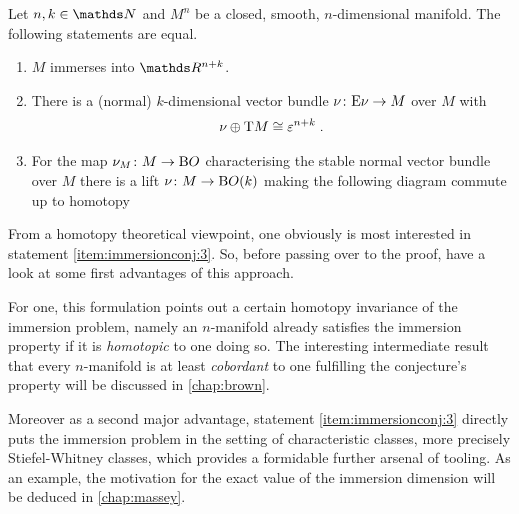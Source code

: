 \begin{Thm}\label{thm:immersionconj:equalities}
  Let $n,k\in\Nat$ and $M^n$ be a closed, smooth, $n$-dimensional manifold.
  The following statements are equal.
  \begin{enumerate}
  \item\label{item:immersionconj:1} $M$ immerses into $\R^{n+k}$.
  \item\label{item:immersionconj:2} There is a (normal) $k$-dimensional vector bundle
    $\nu_{}\colon\mathrm{E}\nu_{}\to M$ over $M$ with
    \begin{gather*}
      \nu_{}\oplus\mathrm{T}M\cong\varepsilon^{n+k}
      \;.
    \end{gather*}
  \item\label{item:immersionconj:3}
    For the map $\nu_{M}\colon M\to\mathrm{B}O$ characterising the stable
    normal vector bundle over $M$
    there is a lift $\nu_{}\colon M\to\mathrm{B}O(k)$ making the following
    diagram commute up to homotopy
    \begin{center}
    \end{center}
  \end{enumerate}
\end{Thm}
From a homotopy theoretical viewpoint, one obviously is most
interested in statement \ref{item:immersionconj:3}.
So, before passing over to the proof, have a look at some first
advantages of this approach.

For one, this formulation points out a certain homotopy invariance of
the immersion problem, namely an $n$-manifold already satisfies the
immersion property if it is \emph{homotopic} to one doing so. 
The interesting intermediate result that every $n$-manifold is
at least \emph{cobordant} to one fulfilling the conjecture's property
will be discussed in \autoref{chap:brown}.

Moreover as a second major advantage, statement
\ref{item:immersionconj:3} directly puts the immersion problem in the
setting of characteristic classes, more precisely Stiefel-Whitney
classes, which provides a formidable further arsenal of tooling.
As an example, the motivation for the exact value of the immersion
dimension will be deduced in \autoref{chap:massey}.

